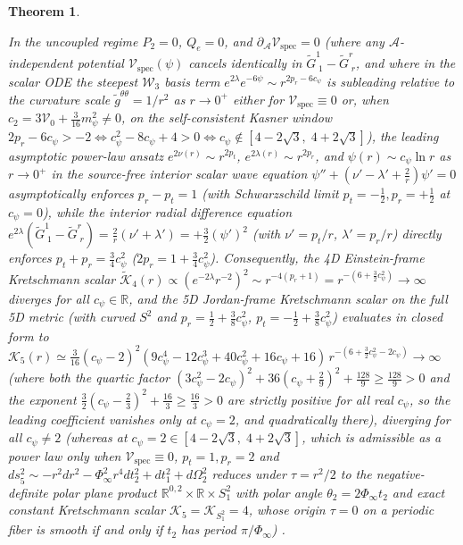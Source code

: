 \documentclass[11pt,a4paper]{article}
\newcommand{\catD}{\text{\textbf{\textcolor{blue!75!black}{[D]}}}}
\theoremstyle{definition}
\theoremstyle{plain}
\newtheorem{theorem}[axiom]{Theorem}
\theoremstyle{remark}
\begin{document}
\begin{theorem}
\begin{enumerate}[label=(\roman*)]
  In the uncoupled regime $P_2 = 0$, $Q_e = 0$, and $\partial_{\mathcal{A}}\mathcal{V}_{\mathrm{spec}} = 0$ (where any $\mathcal{A}$-independent potential $\mathcal{V}_{\mathrm{spec}}(\psi)$ cancels identically in $\tilde{G}^1_{\;1} - \tilde{G}^r_{\;r}$, and where in the scalar ODE the steepest $\mathcal{W}_3$ basis term $e^{2\lambda}e^{-6\psi} \sim r^{2p_r - 6c_\psi}$ is subleading relative to the curvature scale $\tilde{g}^{\theta\theta} = 1/r^2$ as $r \to 0^+$ either for $\mathcal{V}_{\mathrm{spec}} \equiv 0$ or, when $c_2 = 3\mathcal{V}_0 + \frac{3}{16}m_\psi^2 \neq 0$, on the self-consistent Kasner window $2p_r - 6c_\psi > -2 \iff c_\psi^2 - 8c_\psi + 4 > 0 \iff c_\psi \notin [4 - 2\sqrt{3},\; 4 + 2\sqrt{3}]$), the leading asymptotic power-law ansatz $e^{2\nu(r)} \sim r^{2p_t}$, $e^{2\lambda(r)} \sim r^{2p_r}$, and $\psi(r) \sim c_\psi\ln r$ as $r \to 0^+$ in the source-free interior scalar wave equation $\psi'' + (\nu' - \lambda' + \frac{2}{r})\psi' = 0$ asymptotically enforces $p_r - p_t = 1$ (with Schwarzschild limit $p_t = -\frac{1}{2}, p_r = +\frac{1}{2}$ at $c_\psi = 0$), while the interior radial difference equation $e^{2\lambda}(\tilde{G}^1_{\;1} - \tilde{G}^r_{\;r}) = \frac{2}{r}(\nu' + \lambda') = +\frac{3}{2}(\psi')^2$ (with $\nu' = p_t/r$, $\lambda' = p_r/r$) directly enforces $p_t + p_r = \frac{3}{4}c_\psi^2$ ($2p_r = 1 + \frac{3}{4}c_\psi^2$). Consequently, the 4D Einstein-frame Kretschmann scalar $\widetilde{\mathcal{K}}_4(r) \propto (e^{-2\lambda}r^{-2})^2 \sim r^{-4(p_r+1)} = r^{-(6 + \frac{3}{2}c_\psi^2)} \to \infty$ diverges for all $c_\psi \in \mathbb{R}$, and the 5D Jordan-frame Kretschmann scalar on the full 5D metric (with curved $S^2$ and $p_r = \frac{1}{2} + \frac{3}{8}c_\psi^2$, $p_t = -\frac{1}{2} + \frac{3}{8}c_\psi^2$) evaluates in closed form to $\mathcal{K}_5(r) \simeq \frac{3}{16}(c_\psi - 2)^2(9c_\psi^4 - 12c_\psi^3 + 40c_\psi^2 + 16c_\psi + 16)\,r^{-(6 + \frac{3}{2}c_\psi^2 - 2c_\psi)} \to \infty$ (where both the quartic factor $(3c_\psi^2 - 2c_\psi)^2 + 36(c_\psi + \frac{2}{9})^2 + \frac{128}{9} \ge \frac{128}{9} > 0$ and the exponent $\frac{3}{2}(c_\psi - \frac{2}{3})^2 + \frac{16}{3} \ge \frac{16}{3} > 0$ are strictly positive for all real $c_\psi$, so the leading coefficient vanishes only at $c_\psi = 2$, and quadratically there), diverging for all $c_\psi \neq 2$ (whereas at $c_\psi = 2 \in [4 - 2\sqrt{3},\; 4 + 2\sqrt{3}]$, which is admissible as a power law only when $\mathcal{V}_{\mathrm{spec}} \equiv 0$, $p_t = 1, p_r = 2$ and $ds_5^2 \sim -r^2 dr^2 - \Phi_\infty^2 r^4 dt_2^2 + dt_1^2 + d\Omega_2^2$ reduces under $\tau = r^2/2$ to the negative-definite polar plane product $\mathbb{R}^{0,2} \times \mathbb{R} \times S^2_1$ with polar angle $\theta_2 = 2\Phi_\infty t_2$ and exact constant Kretschmann scalar $\mathcal{K}_5 = \mathcal{K}_{S^2_1} = 4$, whose origin $\tau = 0$ on a periodic fiber is smooth if and only if $t_2$ has period $\pi/\Phi_\infty$) \catD.

\end{enumerate}
\end{theorem}
\end{document}
